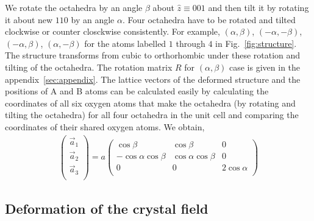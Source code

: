 \documentclass[a4paper,prb]{revtex4-1}  %
\newcommand{\com}[1]{}
\newcommand{\az}[1]{{\color{magenta}{#1}}} %
\begin{document}
We rotate the octahedra by an angle $\beta$ about $\hat z \equiv 001$
and then tilt it by rotating it about new $110$ by an angle $\alpha$.
Four octahedra have to be rotated and tilted clockwise or counter closckwise
consistently. For example, %
$(\alpha,\beta)$,
$(-\alpha,-\beta)$,
$(-\alpha,\beta)$,
$(\alpha,-\beta)$
for the atoms labelled $1$ through $4$ in Fig.~\ref{fig:structure}.
The structure transforms from cubic to orthorhombic under these rotation and tilting of the octahedra.
The rotation matrix $R$ for $(\alpha,\beta)$ case is given in the appendix~\ref{sec:appendix}. 
The lattice vectors of the deformed structure and the positions of A and B atoms can be calculated easily by calculating the coordinates of all six oxygen atoms that make the octahedra (by rotating and tilting the octahedra) for all four octahedra in the unit cell and 
comparing the coordinates of their shared oxygen atoms.
We obtain,
\begin{align}
\left(
\begin{array}{c}
\vec a_1 \\
\vec a_2\\
\vec a_3\\
\end{array}
\right)
= a
\left(
\begin{array}{ccc}
 \cos \beta  & \cos \beta  & 0 \\
 -\cos \alpha  \cos \beta  & \cos \alpha  \cos \beta  & 0 \\
 0 & 0 & 2 \cos \alpha  \\
\end{array}
\right)
\end{align}


\com{
\begin{align}
\vec a_1 & =  \cos\beta ( 1,1,0 ) ,\\
\vec a_2 & =  \cos\alpha  \cos\beta(-1,1,0 ),\\
\vec a_3 & =  \cos\alpha ( 0,0,2 ).
\end{align}
}





\subsection{Deformation of the crystal field}


\end{document}
